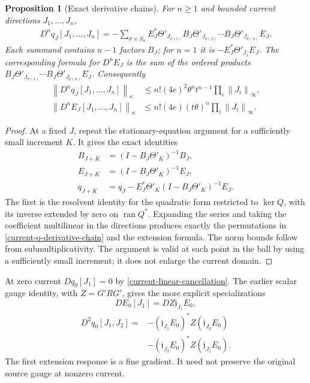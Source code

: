\documentclass[11pt]{article}
\newtheorem{proposition}[theorem]{Proposition}
\theoremstyle{remark}
\newcommand{\norm}[1]{\left\|#1\right\|}
\newcommand{\ran}{\operatorname{ran}}
\begin{document}
\begin{proposition}[Exact derivative chains]
\label{current-derivative-chains}
For $n\ge1$ and bounded current directions $J_1,\ldots,J_n$,
\begin{equation}
 \begin{split}
 D^nq_J[J_1,\ldots,J_n]
 =-\sum_{\sigma\in S_n}
 E_J^*\Theta'_{J_{\sigma(1)}}B_J
 \Theta'_{J_{\sigma(2)}}\cdots B_J
 \Theta'_{J_{\sigma(n)}}E_J.
 \end{split}
 \label{current-q-derivative-chain}
\end{equation}
Each summand contains $n-1$ factors $B_J$; for $n=1$ it is
$-E_J^*\Theta'_{J_1}E_J$. The corresponding formula for $D^nE_J$
is the sum of the ordered products
$B_J\Theta'_{J_{\sigma(1)}}\cdots
B_J\Theta'_{J_{\sigma(n)}}E_J$. Consequently
\begin{align}
 \norm{D^nq_J[J_1,\ldots,J_n]}_\kappa
 &\le n!(4e)^2\theta^n t^{n-1}
                   \prod_i\norm{J_i}_\infty,
 \label{current-q-factorial}\\
 \norm{D^nE_J[J_1,\ldots,J_n]}_\kappa
 &\le n!(4e)(t\theta)^n\prod_i\norm{J_i}_\infty.
 \label{current-E-factorial}
\end{align}
\end{proposition}

\begin{proof}
At a fixed $J$, repeat the stationary-equation argument for a
sufficiently small increment $K$. It gives the exact identities
\begin{align}
 B_{J+K}&=(I-B_J\Theta'_K)^{-1}B_J,
 \label{current-B-increment}\\
 E_{J+K}&=(I-B_J\Theta'_K)^{-1}E_J,
 \label{current-E-increment}\\
 q_{J+K}&=q_J-E_J^*\Theta'_K
                    (I-B_J\Theta'_K)^{-1}E_J.
 \label{current-q-increment}
\end{align}
The first is the resolvent identity for the quadratic form
restricted to $\ker Q$, with its inverse extended by zero on
$\ran Q^*$. Expanding the series and taking the coefficient
multilinear in the directions produces exactly the permutations in
\eqref{current-q-derivative-chain} and the extension formula. The
norm bounds follow from submultiplicativity. The argument is valid
at each point in the ball by using a sufficiently small increment;
it does not enlarge the current domain.
\end{proof}

At zero current $Dq_0[J_1]=0$ by
\eqref{current-linear-cancellation}. The earlier scalar gauge
identity, with $Z=G'RG'$, gives the more explicit specializations
\[
 DE_0[J_1]=DZ\mathfrak j_{J_1}E_0,
\]
\begin{equation}
 \begin{split}
 D^2q_0[J_1,J_2]
 ={}&-(\mathfrak j_{J_1}E_0)^*Z(\mathfrak j_{J_2}E_0)\\
    &-(\mathfrak j_{J_2}E_0)^*Z(\mathfrak j_{J_1}E_0).
 \end{split}
 \label{current-zero-Hessian}
\end{equation}
The first extension response is a fine gradient. It need not
preserve the original source gauge at nonzero current.
\end{document}
